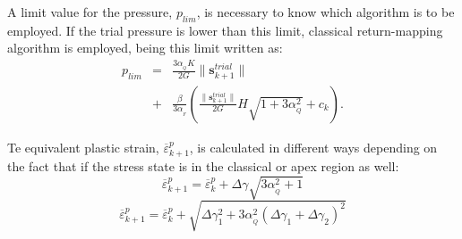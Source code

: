 \documentclass[twocolumn]{svjour3}          %
\begin{document}
A limit value for the pressure, $p_{lim}$, is necessary to know which algorithm is to be employed. If the trial pressure is lower than this limit, classical return-mapping algorithm is employed, being this limit written as:
 \begin{eqnarray}
p_{lim}&=&\frac{3\alpha_{_Q}K}{2G}\|\textbf{s}^{trial}_{k+1}\|\nonumber\\ \label{eq_dp8}
&+&\frac{\beta}{3\alpha_{_F}}\left( \frac{\|\textbf{s}^{trial}_{k+1}\|}{2G}H\sqrt{1+3\alpha_{_Q}^2} + c_k \right).
\end{eqnarray}


 Te equivalent plastic strain, $\overline{\varepsilon}^p_{k+1}$, is calculated in different ways depending on the fact that if the stress state is in the classical or apex region as well:
$$
\overline{\varepsilon}^p_{k+1}=\overline{\varepsilon}^p_{k}+\Delta\gamma\sqrt{3\alpha_{_Q}^2+1}
$$
$$
\overline{\varepsilon}^p_{k+1}=\overline{\varepsilon}^p_{k}+\sqrt{\Delta\gamma_1^2+3\alpha_{_Q}^2\left(\Delta\gamma_1+\Delta\gamma_2 \right)^2}
$$
\end{document}
